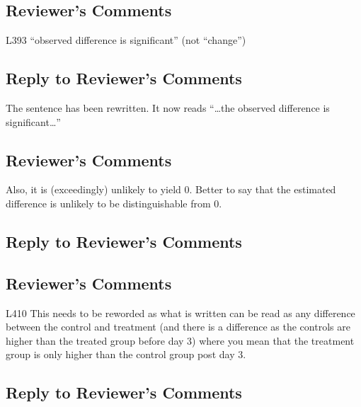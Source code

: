 \documentclass[
]{article}
\begin{document}
\hypertarget{reviewers-comments-33}{%
\subsection{Reviewer's Comments}\label{reviewers-comments-33}}

L393 ``observed difference is significant'' (not ``change'')

\hypertarget{section-34}{%
\subsection{\texorpdfstring{\textcolor{reviewersblue} {Reply to Reviewer's Comments}}{}}\label{section-34}}

The sentence has been rewritten. It now reads ``\ldots the observed difference is significant\ldots{}''

\hypertarget{reviewers-comments-34}{%
\subsection{Reviewer's Comments}\label{reviewers-comments-34}}

Also, it is (exceedingly) unlikely to yield 0. Better to say that the estimated difference is unlikely to be distinguishable from 0.

\hypertarget{section-35}{%
\subsection{\texorpdfstring{\textcolor{reviewersblue} {Reply to Reviewer's Comments}}{}}\label{section-35}}

\hypertarget{reviewers-comments-35}{%
\subsection{Reviewer's Comments}\label{reviewers-comments-35}}

L410 This needs to be reworded as what is written can be read as any difference between the control and treatment (and there is a difference as the controls are higher than the treated group before day 3) where you mean that the treatment group is only higher than the control group post day 3.

\hypertarget{section-36}{%
\subsection{\texorpdfstring{\textcolor{reviewersblue} {Reply to Reviewer's Comments}}{}}\label{section-36}}
\end{document}
